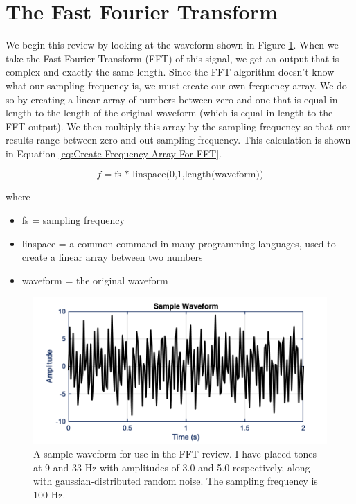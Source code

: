 \section{The Fast Fourier Transform}

We begin this review by looking at the waveform shown in Figure \ref{fig:FFT Sample Waveform}.
When we take the Fast Fourier Transform (FFT) of this signal, we get an output that is complex and exactly the same length.
Since the FFT algorithm doesn't know what our sampling frequency is, we must create our own frequency array. We do so by creating a linear array of numbers between zero and one that is equal in length to the length of the original waveform (which is equal in length to the FFT output).
We then multiply this array by the sampling frequency so that our results range between zero and out sampling frequency.
This calculation is shown in Equation \ref{eq:Create Frequency Array For FFT}.

\begin{equation} \label{eq:Create Frequency Array For FFT}
    f = \text{fs * linspace(0,1,length(waveform))}
\end{equation}

where

\begin{itemize}
    \item fs = sampling frequency
    \item linspace = a common command in many programming languages, used to create a linear array between two numbers
    \item waveform = the original waveform
\end{itemize}

\begin{figure}[H]
    \centering
    \includegraphics[width = 6 in]{Chapters/Signal Processing/Figures/Sample Waveform.png}
    \caption{A sample waveform for use in the FFT review. I have placed tones at 9 and 33 Hz with amplitudes of 3.0 and 5.0 respectively, along with gaussian-distributed random noise. The sampling frequency is 100 Hz.}
    \label{fig:FFT Sample Waveform}
\end{figure}

